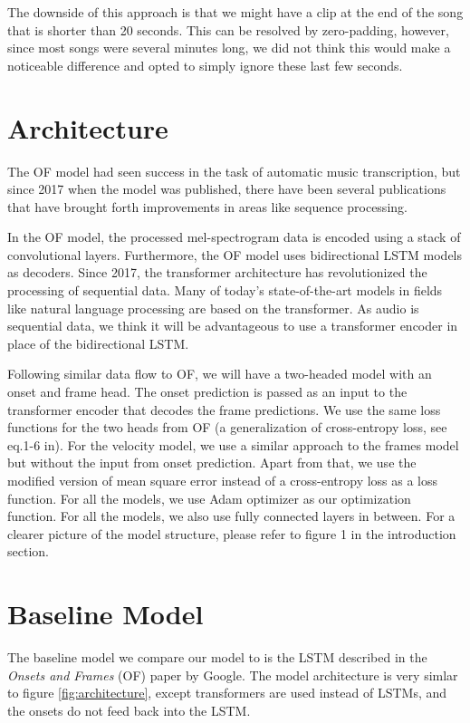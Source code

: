 \documentclass[a4paper,twocolumn,10pt]{article}
\begin{document}
The downside of this approach is that we might have a clip at the end of the song that is shorter than 20 seconds. This can be resolved by zero-padding, however, since most songs were several minutes long, we did not think this would make a noticeable difference and opted to simply ignore these last few seconds.
\section{Architecture}
The OF model\cite{onsets_and_frames} had seen success in the task of automatic music transcription, but since 2017 when the model was published, there have been several publications that have brought forth improvements in areas like sequence processing.

In the OF model, the processed mel-spectrogram data is encoded using a stack of convolutional layers\cite{rainer}. Furthermore, the OF model uses bidirectional LSTM models as decoders. Since 2017, the transformer architecture has revolutionized the processing of sequential data\cite{attention}. Many of today’s state-of-the-art models in fields like natural language processing are based on the transformer. As audio is sequential data, we think it will be advantageous to use a transformer encoder in place of the bidirectional LSTM.

Following similar data flow to OF, we will have a two-headed model with an onset and frame head. The onset prediction is passed as an input to the transformer encoder that decodes the frame predictions. We use the same loss functions for the two heads from OF (a generalization of cross-entropy loss, see eq.1-6 in\cite{onsets_and_frames}). For the velocity model, we use a similar approach to the frames model but without the input from onset prediction. Apart from that, we use the modified version of mean square error instead of a cross-entropy loss as a loss function. For all the models, we use Adam optimizer as our optimization function.  For all the models, we also use fully connected layers in between. For a clearer picture of the model structure, please refer to figure 1 in the introduction section.

\section{Baseline Model}
The baseline model we compare our model to is the LSTM described in the \textit{Onsets and Frames} (OF) paper by Google\cite{onsets_and_frames}. The model architecture is very simlar to figure \ref{fig:architecture}, except transformers are used instead of LSTMs, and the onsets do not feed back into the LSTM.
\end{document}
